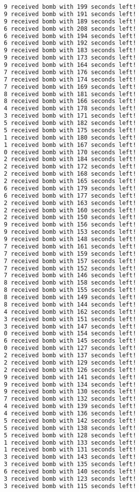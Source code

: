 \documentclass{article}
\begin{document}
\begin{lstlisting}[language=bash]
9 received bomb with 199 seconds left!
9 received bomb with 191 seconds left!
9 received bomb with 189 seconds left!
6 received bomb with 208 seconds left!
6 received bomb with 194 seconds left!
6 received bomb with 192 seconds left!
9 received bomb with 183 seconds left!
9 received bomb with 173 seconds left!
9 received bomb with 164 seconds left!
7 received bomb with 176 seconds left!
7 received bomb with 174 seconds left!
7 received bomb with 169 seconds left!
8 received bomb with 181 seconds left!
8 received bomb with 166 seconds left!
4 received bomb with 178 seconds left!
3 received bomb with 171 seconds left!
5 received bomb with 182 seconds left!
5 received bomb with 175 seconds left!
1 received bomb with 180 seconds left!
1 received bomb with 167 seconds left!
0 received bomb with 170 seconds left!
2 received bomb with 184 seconds left!
2 received bomb with 172 seconds left!
2 received bomb with 168 seconds left!
2 received bomb with 165 seconds left!
6 received bomb with 179 seconds left!
6 received bomb with 177 seconds left!
2 received bomb with 163 seconds left!
2 received bomb with 160 seconds left!
2 received bomb with 150 seconds left!
9 received bomb with 156 seconds left!
9 received bomb with 153 seconds left!
9 received bomb with 148 seconds left!
7 received bomb with 161 seconds left!
7 received bomb with 159 seconds left!
7 received bomb with 157 seconds left!
7 received bomb with 152 seconds left!
7 received bomb with 146 seconds left!
8 received bomb with 158 seconds left!
8 received bomb with 155 seconds left!
8 received bomb with 149 seconds left!
8 received bomb with 144 seconds left!
4 received bomb with 162 seconds left!
3 received bomb with 151 seconds left!
3 received bomb with 147 seconds left!
0 received bomb with 154 seconds left!
6 received bomb with 145 seconds left!
0 received bomb with 127 seconds left!
2 received bomb with 137 seconds left!
2 received bomb with 129 seconds left!
2 received bomb with 126 seconds left!
9 received bomb with 141 seconds left!
9 received bomb with 134 seconds left!
9 received bomb with 130 seconds left!
7 received bomb with 132 seconds left!
4 received bomb with 139 seconds left!
4 received bomb with 136 seconds left!
5 received bomb with 142 seconds left!
5 received bomb with 138 seconds left!
5 received bomb with 128 seconds left!
1 received bomb with 133 seconds left!
1 received bomb with 131 seconds left!
3 received bomb with 143 seconds left!
3 received bomb with 135 seconds left!
6 received bomb with 140 seconds left!
3 received bomb with 123 seconds left!
3 received bomb with 115 seconds left!

\end{lstlisting}
\end{document}
